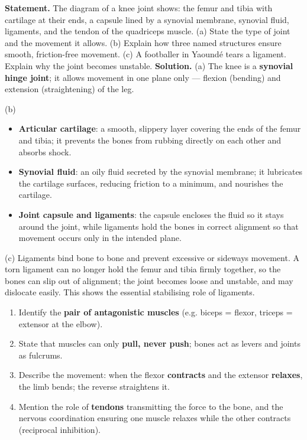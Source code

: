 \documentclass[11pt]{article}
\begin{document}
\begin{exoresolu}
\textbf{Statement.} The diagram of a knee joint shows: the femur and tibia with cartilage at their ends, a capsule lined by a synovial membrane, synovial fluid, ligaments, and the tendon of the quadriceps muscle. (a) State the type of joint and the movement it allows. (b) Explain how three named structures ensure smooth, friction-free movement. (c) A footballer in Yaoundé tears a ligament. Explain why the joint becomes unstable.
\tcblower
\textbf{Solution.}
(a) The knee is a \textbf{synovial hinge joint}; it allows movement in one plane only --- flexion (bending) and extension (straightening) of the leg.

(b)
\begin{itemize}
\item \textbf{Articular cartilage}: a smooth, slippery layer covering the ends of the femur and tibia; it prevents the bones from rubbing directly on each other and absorbs shock.
\item \textbf{Synovial fluid}: an oily fluid secreted by the synovial membrane; it lubricates the cartilage surfaces, reducing friction to a minimum, and nourishes the cartilage.
\item \textbf{Joint capsule and ligaments}: the capsule encloses the fluid so it stays around the joint, while ligaments hold the bones in correct alignment so that movement occurs only in the intended plane.
\end{itemize}

(c) Ligaments bind bone to bone and prevent excessive or sideways movement. A torn ligament can no longer hold the femur and tibia firmly together, so the bones can slip out of alignment; the joint becomes loose and unstable, and may dislocate easily. This shows the essential stabilising role of ligaments.
\end{exoresolu}

\begin{methode}
\begin{enumerate}
\item Identify the \textbf{pair of antagonistic muscles} (e.g. biceps = flexor, triceps = extensor at the elbow).
\item State that muscles can only \textbf{pull, never push}; bones act as levers and joints as fulcrums.
\item Describe the movement: when the flexor \textbf{contracts} and the extensor \textbf{relaxes}, the limb bends; the reverse straightens it.
\item Mention the role of \textbf{tendons} transmitting the force to the bone, and the nervous coordination ensuring one muscle relaxes while the other contracts (reciprocal inhibition).
\end{enumerate}
\end{methode}
\end{document}
